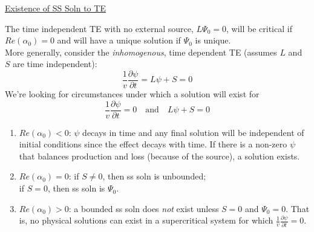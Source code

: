 \documentclass[12pt]{article}
\begin{document}
\vspace*{1 em}
\underline{Existence of SS Soln to TE}

The time independent TE with no external source, $L\Psi_0 = 0$, will be critical if $Re(\alpha_0) = 0$ and will have a unique solution if $\Psi_0$ is unique. \\
More generally, consider the \textit{inhomogenous}, time dependent TE (assumes $L$ and $S$ are time independent):
%
\[\frac{1}{v}\frac{\partial \psi}{\partial t} = L\psi + S = 0\]
%
We're looking for circumstances under which a solution will exist for
\[\frac{1}{v}\frac{\partial \psi}{\partial t} = 0 \quad \text{and} \quad L\psi + S = 0\]

\begin{enumerate}
\item $Re(\alpha_0) < 0$: $\psi$ decays in time and any final solution will be independent of initial conditions since the effect decays with time. If there is a non-zero $\psi$ that balances production and loss (because of the source), a solution exists.
\item $Re(\alpha_0) = 0$: if $S \neq 0$, then ss soln is unbounded; \\
\hspace*{5.5 em}if $S=0$, then ss soln is $\Psi_0$.
\item $Re(\alpha_0) > 0$: a bounded ss soln does \textit{not} exist unless $S=0$ and $\Psi_0 = 0$. That is, no physical solutions can exist in a supercritical system for which $\frac{1}{v}\frac{\partial \psi}{\partial t} = 0$.
\end{enumerate}
\end{document}
